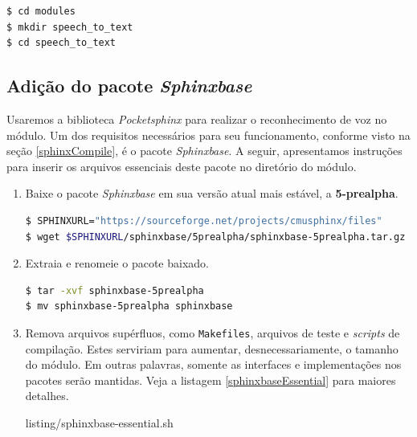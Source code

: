 \begin{minipage}{\linewidth}
\begin{lstlisting}[language=Bash]
$ cd modules
$ mkdir speech_to_text
$ cd speech_to_text
\end{lstlisting}
\end{minipage}


\subsection{Adição do pacote \textit{Sphinxbase}}

Usaremos a biblioteca \textit{Pocketsphinx} para realizar o reconhecimento de voz no módulo. Um dos requisitos necessários para seu funcionamento, conforme visto na seção \ref{sphinxCompile}, é o pacote \textit{Sphinxbase}. A seguir, apresentamos instruções para inserir os arquivos essenciais deste pacote no diretório do módulo.

\begin{enumerate}
\item Baixe o pacote \textit{Sphinxbase} em sua versão atual mais estável, a \textbf{5-prealpha}.

\begin{lstlisting}[language=Bash]
$ SPHINXURL="https://sourceforge.net/projects/cmusphinx/files"
$ wget $SPHINXURL/sphinxbase/5prealpha/sphinxbase-5prealpha.tar.gz
\end{lstlisting}

\item Extraia e renomeie o pacote baixado.

\begin{lstlisting}[language=Bash]
$ tar -xvf sphinxbase-5prealpha
$ mv sphinxbase-5prealpha sphinxbase
\end{lstlisting}

\item Remova arquivos supérfluos, como \texttt{Makefiles}, arquivos de teste e \textit{scripts} de compilação. Estes serviriam para aumentar, desnecessariamente, o tamanho do módulo. Em outras palavras, somente as interfaces e implementações nos pacotes serão mantidas. Veja a listagem \ref{sphinxbaseEssential} para maiores detalhes.


  {listing/sphinxbase-essential.sh}
\end{enumerate}

